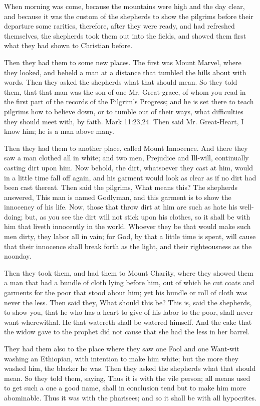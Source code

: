 When morning was come, because the mountains were high and the day clear, and because it was the custom of the shepherds to show the pilgrims before their departure some rarities, therefore, after they were ready, and had refreshed themselves, the shepherds took them out into the fields, and showed them first what they had shown to Christian before.

Then they had them to some new places. The first was Mount Marvel, where they looked, and beheld a man at a distance that tumbled the hills about with words. Then they asked the shepherds what that should mean. So they told them, that that man was the son of one Mr. Great-grace, of whom you read in the first part of the records of the Pilgrim's Progress; and he is set there to teach pilgrims how to believe down, or to tumble out of their ways, what difficulties they should meet with, by faith. Mark 11:23,24. Then said Mr. Great-Heart, I know him; he is a man above many.

Then they had them to another place, called Mount Innocence. And there they saw a man clothed all in white; and two men, Prejudice and Ill-will, continually casting dirt upon him. Now behold, the dirt, whatsoever they cast at him, would in a little time fall off again, and his garment would look as clear as if no dirt had been cast thereat. Then said the pilgrims, What means this? The shepherds answered, This man is named Godlyman, and this garment is to show the innocency of his life. Now, those that throw dirt at him are such as hate his well-doing; but, as you see the dirt will not stick upon his clothes, so it shall be with him that liveth innocently in the world. Whoever they be that would make such men dirty, they labor all in vain; for God, by that a little time is spent, will cause that their innocence shall break forth as the light, and their righteousness as the noonday.

Then they took them, and had them to Mount Charity, where they showed them a man that had a bundle of cloth lying before him, out of which he cut coats and garments for the poor that stood about him; yet his bundle or roll of cloth was never the less. Then said they, What should this be? This is, said the shepherds, to show you, that he who has a heart to give of his labor to the poor, shall never want wherewithal. He that watereth shall be watered himself. And the cake that the widow gave to the prophet did not cause that she had the less in her barrel.

They had them also to the place where they saw one Fool and one Want-wit washing an Ethiopian, with intention to make him white; but the more they washed him, the blacker he was. Then they asked the shepherds what that should mean. So they told them, saying, Thus it is with the vile person; all means used to get such a one a good name, shall in conclusion tend but to make him more abominable. Thus it was with the pharisees; and so it shall be with all hypocrites.

